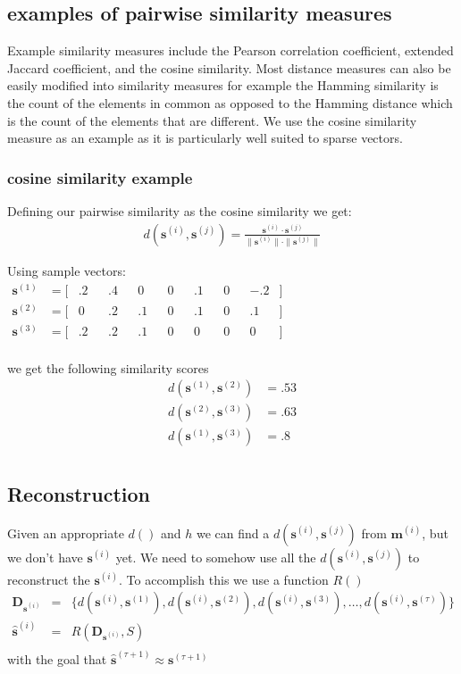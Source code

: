 \documentclass{article} %
\newcommand{\Mt}[1]{\textbf{m}^{(#1)}}
\newcommand{\st}[1]{\textbf{s}^{(#1)}}
\newcommand{\sthat}[1]{\hat{\textbf{s}}^{(#1)}}
\newcommand{\pairsim}[1]{d(#1)}
\newcommand{\pairset}[1]{\bm{D}_{#1}}
\newcommand{\reveng}[1]{R(#1)}
\begin{document}
\subsection{examples of pairwise similarity measures}
Example similarity measures include the Pearson correlation coefficient, extended Jaccard coefficient, and the cosine similarity. Most distance measures can also be easily modified into similarity measures for example the Hamming similarity is the count of the elements in common as opposed to the Hamming distance which is the count of the elements that are different. We use the cosine similarity measure as an example as it is particularly well suited to sparse vectors.  
\subsubsection{cosine similarity example} \label{cosine}
Defining our pairwise similarity as the cosine similarity we get:
\begin{eqnarray}
	\pairsim{\st{i},\st{j}} = \frac{  \st{i} \cdot \st{j}  } {  \|\st{i} \| \cdot \|\st{j}\|  }
\end{eqnarray}

Using sample vectors:
\begin{align*}
\st{1} &= [&.2&	&.4& 	&0&	&0&	&.1& 	&0& &-.2& ]&&&&&&&&&&&&&&&&&&\\
\st{2} &= [&0&	&.2&	&.1&	&0&	&.1& 	&0& &.1& ] &&&&&&&&&&&&&&&&&&\\
\st{3} &= [&.2&	&.2& 	&.1&	&0&	&0&	&0&   &0& ]&&&&&&&&&&&&&&&&&&\\
\end{align*}

we get the following similarity scores 
\begin{eqnarray*}
\pairsim{\st{1},\st{2}} &= .53\\
\pairsim{\st{2},\st{3}} &= .63\\
\pairsim{\st{1},\st{3}} &= .8\\
\end{eqnarray*}


\subsection{Reconstruction}
Given an appropriate $\pairsim{}$ and $h{}$ we can find a $\pairsim{\st{i},\st{j} }$ from $\Mt{i}$, but we don't have $\st{i}$ yet. We need to somehow use all the $\pairsim{\st{i},\st{j}} $ to reconstruct the $\st{i}$. To accomplish this we use a function $\reveng{}$ 
\begin{eqnarray*}
	\pairset{\st{i}} &=& \{ \pairsim{\st{i},\st{1} } , \pairsim{\st{i},\st{2} } , \pairsim{\st{i},\st{3} } , \dots , \pairsim{\st{i},\st{\tau} } \} \\
	  \sthat{i} &=& \reveng{ \pairset{\st{i}}, S  } \\
\end{eqnarray*}
with the goal that $\sthat{\tau+1} \approx \st{\tau+1}$ 
\end{document}
